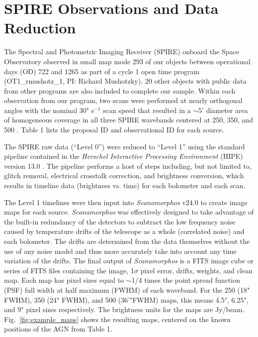 \section{\herschel{} SPIRE Observations and Data Reduction}\label{sec:obs}
The Spectral and Photometric Imaging Receiver (SPIRE) \citep{Griffin:2010sf} onboard the \herschel{} Space Observatory \citep{Pilbratt:2010rz} observed in small map mode 293 of our objects between operational days (OD) 722 and 1265 as part of a cycle 1 open time program (OT1\_rmushotz\_1, PI: Richard Mushotzky). 20 other objects with public data from other programs are also included to complete our sample. Within each observation from our program, two scans were performed at nearly orthogonal angles with the nominal 30" s$^{-1}$ scan speed that resulted in a $\sim$5' diameter area of homogeneous coverage in all three SPIRE wavebands centered at 250, 350, and 500 \um. Table 1 lists the proposal ID and observational ID for each source.

The SPIRE raw data (``Level 0'') were reduced to ``Level 1'' using the standard pipeline contained in the \textit{Herschel Interactive Processing Environment} (HIPE) version 13.0 \citep{Ott:2010rm}. The pipeline performs a host of steps including, but not limited to, glitch removal, electrical crosstalk correction, and brightness conversion, which results in timeline data (brightness vs. time) for each bolometer and each scan. 

The Level 1 timelines were then input into \textit{Scanamorphos} v24.0 \citep{Roussel:2013gf} to create image maps for each source. \textit{Scanamorphos} was effectively designed to take advantage of the built-in redundancy of the detectors to subtract the low frequency noise caused by temperature drifts of the telescope as a whole (correlated noise) and each bolometer. The drifts are determined from the data themselves without the use of any noise model and thus more accurately take into account any time variation of the drifts. The final output of \textit{Scanamorphos} is a FITS image cube or series of FITS files containing the image, 1$\sigma$ pixel error, drifts, weights, and clean map. Each map has pixel sizes equal to $ \sim$1/4 times the point spread function (PSF) full width at half maximum (FWHM) of each waveband. For the 250 (18" FWHM), 350 (24" FWHM), and 500 \um{} (36'"FWHM) maps, this means 4.5", 6.25", and 9" pixel sizes respectively. The brightness units for the maps are Jy/beam. Fig.~\ref{fig:example_maps} shows the resulting maps, centered on the known positions of the AGN from Table 1.
  
  
  
  